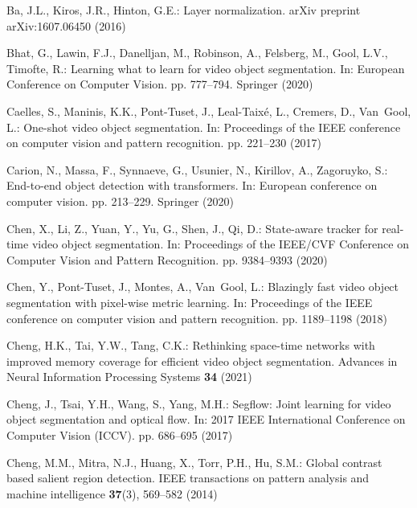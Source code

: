 \documentclass[runningheads]{llncs}
\begin{document}
\clearpage

\begin{thebibliography}{10}
\providecommand{\url}[1]{\texttt{#1}}
\providecommand{\urlprefix}{URL }
\providecommand{\doi}[1]{https://doi.org/#1}

Ba, J.L., Kiros, J.R., Hinton, G.E.: Layer normalization. arXiv preprint
  arXiv:1607.06450  (2016)

Bhat, G., Lawin, F.J., Danelljan, M., Robinson, A., Felsberg, M., Gool, L.V.,
  Timofte, R.: Learning what to learn for video object segmentation. In:
  European Conference on Computer Vision. pp. 777--794. Springer (2020)

Caelles, S., Maninis, K.K., Pont-Tuset, J., Leal-Taix{\'e}, L., Cremers, D.,
  Van~Gool, L.: One-shot video object segmentation. In: Proceedings of the IEEE
  conference on computer vision and pattern recognition. pp. 221--230 (2017)

Carion, N., Massa, F., Synnaeve, G., Usunier, N., Kirillov, A., Zagoruyko, S.:
  End-to-end object detection with transformers. In: European conference on
  computer vision. pp. 213--229. Springer (2020)

Chen, X., Li, Z., Yuan, Y., Yu, G., Shen, J., Qi, D.: State-aware tracker for
  real-time video object segmentation. In: Proceedings of the IEEE/CVF
  Conference on Computer Vision and Pattern Recognition. pp. 9384--9393 (2020)

Chen, Y., Pont-Tuset, J., Montes, A., Van~Gool, L.: Blazingly fast video object
  segmentation with pixel-wise metric learning. In: Proceedings of the IEEE
  conference on computer vision and pattern recognition. pp. 1189--1198 (2018)

Cheng, H.K., Tai, Y.W., Tang, C.K.: Rethinking space-time networks with
  improved memory coverage for efficient video object segmentation. Advances in
  Neural Information Processing Systems  \textbf{34} (2021)

Cheng, J., Tsai, Y.H., Wang, S., Yang, M.H.: Segflow: Joint learning for video
  object segmentation and optical flow. In: 2017 IEEE International Conference
  on Computer Vision (ICCV). pp. 686--695 (2017)

Cheng, M.M., Mitra, N.J., Huang, X., Torr, P.H., Hu, S.M.: Global contrast
  based salient region detection. IEEE transactions on pattern analysis and
  machine intelligence  \textbf{37}(3),  569--582 (2014)


\end{thebibliography}
\end{document}
